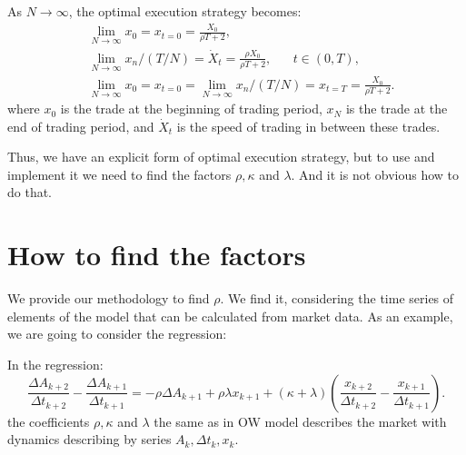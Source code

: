 \begin{theorem}
    As $N \rightarrow \infty$, the optimal execution strategy becomes:
    \begin{align*}
        & \lim _{N \rightarrow \infty} x_0 = x_{t = 0} = \frac{X_0}{\rho T + 2}, \\
        & \lim _{N \rightarrow \infty} x_n / (T/N) = \dot X _t = \frac{\rho X_0}{\rho T + 2}, \;\;\;\;\;\; t \in (0, T), \\
        & \lim _{N \rightarrow \infty} x_0 = x_{t = 0} = \lim _{N \rightarrow \infty} x_n / (T/N) = x_{t=T}=  \frac{X_0}{\rho T + 2}.  %
    \end{align*}
    where $x_0$ is the trade at the beginning of trading period, $x_N$ is the trade at the end of trading
    period, and $\dot X _t$ is the speed of trading in between these trades.
\end{theorem}

Thus, we have an explicit form of optimal execution strategy, but to use and implement it we need to find the factors 
$\rho, \kappa$ and $\lambda$. And it is not obvious how to do that.


\section{How to find the factors}

We provide our methodology to find $\rho$. We find it, considering the time series of elements of the model 
that can be calculated from market data. As an example, we are going to consider the regression:
\begin{theorem}
        In the regression:                                                                                                                                                                                                                                                                                                                                                                                        
        \begin{equation*}
            \frac{\Delta A_{k+2}}{\Delta t_{k+2}} - \frac{\Delta A_{k+1}}{\Delta t_{k+1}} 
        = - \rho \Delta A_{k+1} + \rho \lambda x_{k+1} + (\kappa + \lambda) (\frac{x_{k+2}}{\Delta t_{k+2}} - \frac{x_{k+1}}{\Delta t_{k+1}}).
        \end{equation*}
        the coefficients $\rho, \kappa$ and $\lambda$ the same as in OW model describes the market with dynamics
        describing by series $A_k, \Delta t _k, x_k$.
\end{theorem}

